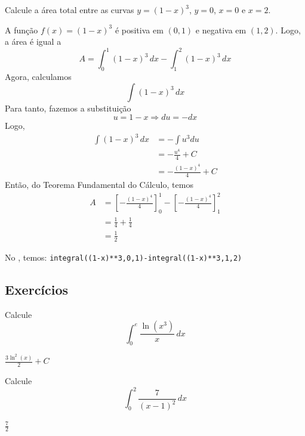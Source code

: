 \cleardoublepage\documentclass[../main.tex]{subfiles}
\begin{document}
\begin{exeresol}
  Calcule a área total entre as curvas $y=(1-x)^3$, $y=0$, $x=0$ e $x=2$.
  \begin{resol}
  A função $f(x) = (1-x)^3$ é positiva em $(0, 1)$ e negativa em $(1, 2)$. Logo, a área é igual a
  \begin{equation*}
    A = \int_0^1 (1-x)^3\,dx - \int_1^2 (1-x)^3\,dx
  \end{equation*}
  Agora, calculamos
  \begin{equation*}
    \int (1-x)^3\,dx
  \end{equation*}
  Para tanto, fazemos a substituição
  \begin{equation*}
    u = 1-x \Rightarrow du = -dx
  \end{equation*}
  Logo,
  \begin{align*}
    \int (1-x)^3\,dx &= -\int u^3du \\
                     &= -\frac{u^4}{4} + C \\
                     &= -\frac{(1-x)^4}{4} + C
  \end{align*}
  Então, do Teorema Fundamental do Cálculo, temos
  \begin{align*}
    A &= \left[-\frac{(1-x)^4}{4}\right]_0^1 - \left[-\frac{(1-x)^4}{4}\right]_1^2 \\
      &= \frac{1}{4} + \frac{1}{4} \\
      &= \frac{1}{2}
  \end{align*}

  
  No \geogebra, temos: \verb|integral((1-x)**3,0,1)-integral((1-x)**3,1,2)|
\end{resol}
\end{exeresol}
\subsection{Exercícios}

\begin{exer}
  Calcule
  \begin{equation*}
    \int_0^e \frac{\ln(x^3)}{x}\,dx
  \end{equation*}
\end{exer}
\begin{resp}
  $\displaystyle \frac{3\ln^2(x)}{2} + C$
\end{resp}

\begin{exer}
  Calcule
  \begin{equation*}
    \int_0^2 \frac{7}{(x-1)^2}\,dx
  \end{equation*}
\end{exer}
\begin{resp}
  $\frac{7}{2}$
\end{resp}
\end{document}
